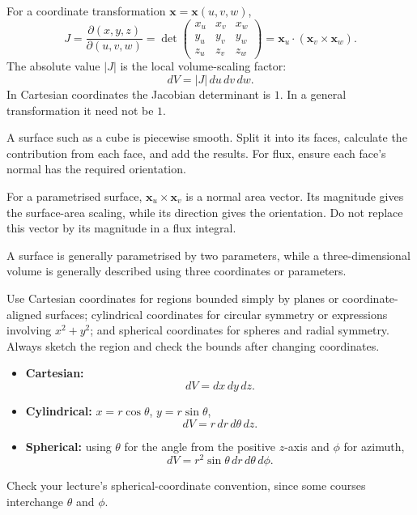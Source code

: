 \begin{blackbox}
  For a coordinate transformation $\mathbf{x}=\mathbf{x}(u,v,w)$,
  \[
    J=\frac{\partial(x,y,z)}{\partial(u,v,w)}
    =\det\begin{pmatrix}
      x_u & x_v & x_w\\
      y_u & y_v & y_w\\
      z_u & z_v & z_w
    \end{pmatrix}
    =\mathbf{x}_u\cdot(\mathbf{x}_v\times\mathbf{x}_w).
  \]
  The absolute value $|J|$ is the local volume-scaling factor:
  \[
    dV=|J|\,du\,dv\,dw.
  \]
  In Cartesian coordinates the Jacobian determinant is $1$. In a general transformation it need not be $1$.
\end{blackbox}

\begin{mistake}
  A surface such as a cube is piecewise smooth. Split it into its faces, calculate the contribution from each face, and add the results. For flux, ensure each face's normal has the required orientation.
\end{mistake}

\begin{mistake}
  For a parametrised surface, $\mathbf{x}_u\times\mathbf{x}_v$ is a normal area vector. Its magnitude gives the surface-area scaling, while its direction gives the orientation. Do not replace this vector by its magnitude in a flux integral.
\end{mistake}

\begin{mistake}
  A surface is generally parametrised by two parameters, while a three-dimensional volume is generally described using three coordinates or parameters.
\end{mistake}

\begin{mistake}
  Use Cartesian coordinates for regions bounded simply by planes or coordinate-aligned surfaces; cylindrical coordinates for circular symmetry or expressions involving $x^2+y^2$; and spherical coordinates for spheres and radial symmetry. Always sketch the region and check the bounds after changing coordinates.
\end{mistake}

\begin{blackbox}
  \begin{itemize}
    \item \textbf{Cartesian:}
    \[
      dV=dx\,dy\,dz.
    \]
    \item \textbf{Cylindrical:} $x=r\cos\theta$, $y=r\sin\theta$,
    \[
      dV=r\,dr\,d\theta\,dz.
    \]
    \item \textbf{Spherical:} using $\theta$ for the angle from the positive $z$-axis and $\phi$ for azimuth,
    \[
      dV=r^2\sin\theta\,dr\,d\theta\,d\phi.
    \]
  \end{itemize}
  Check your lecture's spherical-coordinate convention, since some courses interchange $\theta$ and $\phi$.
\end{blackbox}

